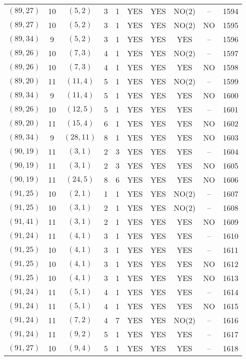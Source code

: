 \begin{longtable}{|c|c|c|c|c|c|c|c|c|c|}
$(89, 27)$ & 10 & $(5, 2)$ & 3 & 1 & YES & YES & NO(2) & -- & 1594\\
$(89, 27)$ & 10 & $(5, 2)$ & 3 & 1 & YES & YES & NO(2) & NO & 1595\\
$(89, 34)$ & 9 & $(5, 2)$ & 3 & 1 & YES & YES & YES & -- & 1596\\
$(89, 26)$ & 10 & $(7, 3)$ & 4 & 1 & YES & YES & NO(2) & -- & 1597\\
$(89, 26)$ & 10 & $(7, 3)$ & 4 & 1 & YES & YES & YES & NO & 1598\\
$(89, 20)$ & 11 & $(11, 4)$ & 5 & 1 & YES & YES & NO(2) & -- & 1599\\
$(89, 34)$ & 9 & $(11, 4)$ & 5 & 1 & YES & YES & YES & NO & 1600\\
$(89, 26)$ & 10 & $(12, 5)$ & 5 & 1 & YES & YES & YES & -- & 1601\\
$(89, 20)$ & 11 & $(15, 4)$ & 6 & 1 & YES & YES & YES & NO & 1602\\
$(89, 34)$ & 9 & $(28, 11)$ & 8 & 1 & YES & YES & YES & NO & 1603\\
$(90, 19)$ & 11 & $(3, 1)$ & 2 & 3 & YES & YES & YES & -- & 1604\\
$(90, 19)$ & 11 & $(3, 1)$ & 2 & 3 & YES & YES & YES & NO & 1605\\
$(90, 19)$ & 11 & $(24, 5)$ & 8 & 6 & YES & YES & YES & NO & 1606\\
$(91, 25)$ & 10 & $(2, 1)$ & 1 & 1 & YES & YES & NO(2) & -- & 1607\\
$(91, 25)$ & 10 & $(3, 1)$ & 2 & 1 & YES & YES & NO(2) & -- & 1608\\
$(91, 41)$ & 11 & $(3, 1)$ & 2 & 1 & YES & YES & YES & NO & 1609\\
$(91, 24)$ & 11 & $(4, 1)$ & 3 & 1 & YES & YES & YES & -- & 1610\\
$(91, 25)$ & 10 & $(4, 1)$ & 3 & 1 & YES & YES & YES & -- & 1611\\
$(91, 25)$ & 10 & $(4, 1)$ & 3 & 1 & YES & YES & YES & NO & 1612\\
$(91, 25)$ & 10 & $(4, 1)$ & 3 & 1 & YES & YES & YES & NO & 1613\\
$(91, 24)$ & 11 & $(5, 1)$ & 4 & 1 & YES & YES & YES & -- & 1614\\
$(91, 24)$ & 11 & $(5, 1)$ & 4 & 1 & YES & YES & YES & NO & 1615\\
$(91, 24)$ & 11 & $(7, 2)$ & 4 & 7 & YES & YES & NO(2) & -- & 1616\\
$(91, 24)$ & 11 & $(9, 2)$ & 5 & 1 & YES & YES & YES & -- & 1617\\
$(91, 27)$ & 10 & $(9, 4)$ & 5 & 1 & YES & YES & YES & -- & 1618\\

\end{longtable}
